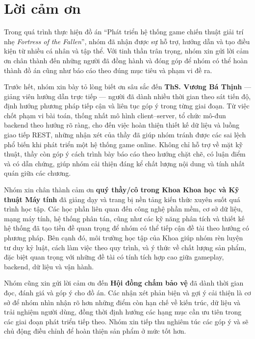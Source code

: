 ﻿%
\section*{Lời cảm ơn}

Trong quá trình thực hiện đồ án ``Phát triển hệ thống game chiến thuật giải trí nhẹ \textit{Fortress of the Fallen}'', nhóm đã nhận được sự hỗ trợ, hướng dẫn và tạo điều kiện từ nhiều cá nhân và tập thể. Với tinh thần trân trọng, nhóm xin gửi lời cảm ơn chân thành đến những người đã đồng hành và đóng góp để nhóm có thể hoàn thành đồ án cũng như báo cáo theo đúng mục tiêu và phạm vi đề ra.

Trước hết, nhóm xin bày tỏ lòng biết ơn sâu sắc đến \textbf{ThS. Vương Bá Thịnh} --- giảng viên hướng dẫn trực tiếp --- người đã dành nhiều thời gian theo sát tiến độ, định hướng phương pháp tiếp cận và liên tục góp ý trong từng giai đoạn. Từ việc chốt phạm vi bài toán, thống nhất mô hình client--server, tổ chức mô-đun backend theo hướng rõ ràng, cho đến việc hoàn thiện thiết kế dữ liệu và luồng giao tiếp REST, những nhận xét của thầy đã giúp nhóm tránh được các sai lệch phổ biến khi phát triển một hệ thống game online. Không chỉ hỗ trợ về mặt kỹ thuật, thầy còn góp ý cách trình bày báo cáo theo hướng chặt chẽ, có luận điểm và có dẫn chứng, giúp nhóm cải thiện đáng kể chất lượng nội dung và tính nhất quán giữa các chương.

Nhóm xin chân thành cảm ơn \textbf{quý thầy/cô trong Khoa Khoa học và Kỹ thuật Máy tính} đã giảng dạy và trang bị nền tảng kiến thức xuyên suốt quá trình học tập. Các học phần liên quan đến công nghệ phần mềm, cơ sở dữ liệu, mạng máy tính, hệ thống phân tán, cũng như các kỹ năng phân tích và thiết kế hệ thống đã tạo tiền đề quan trọng để nhóm có thể tiếp cận đề tài theo hướng có phương pháp. Bên cạnh đó, môi trường học tập của Khoa giúp nhóm rèn luyện tư duy kỷ luật, cách làm việc theo quy trình, và ý thức về chất lượng sản phẩm, đặc biệt quan trọng với những đề tài có tính tích hợp cao giữa gameplay, backend, dữ liệu và vận hành.

Nhóm cũng xin gửi lời cảm ơn đến \textbf{Hội đồng chấm bảo vệ} đã dành thời gian đọc, đánh giá và góp ý cho đồ án. Các nhận xét phản biện và gợi ý cải thiện là cơ sở để nhóm nhìn nhận rõ hơn những điểm còn hạn chế về kiến trúc, dữ liệu và trải nghiệm người dùng, đồng thời định hướng các hạng mục cần ưu tiên trong các giai đoạn phát triển tiếp theo. Nhóm xin tiếp thu nghiêm túc các góp ý và sẽ chủ động điều chỉnh để hoàn thiện sản phẩm ở mức tốt hơn.

